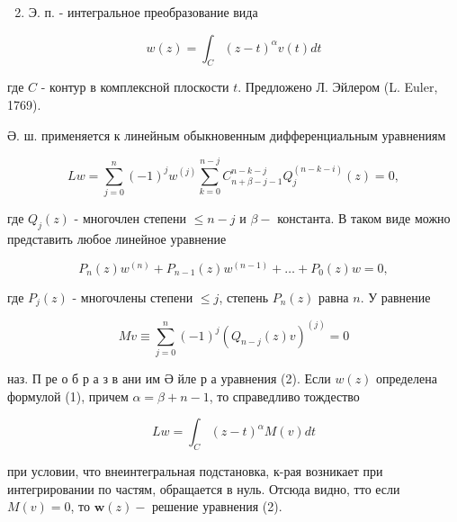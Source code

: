 \documentclass[10pt]{article}
\begin{document}
\begin{enumerate}

  \setcounter{enumi}{1}

  \item Э. п. - интегральное преобразование вида

\end{enumerate}



\[

w(z)=\int_{C}(z-t)^{\alpha} v(t) d t

\]



где $C$ - контур в комплексной плоскости $t$. Предложено Л. Эйлером (L. Euler, 1769).



Ә. ш. применяется к линейным обыкновенным дифференциальным уравнениям



\[

L w=\sum_{j=0}^{n}(-1)^{j} w^{(j)} \sum_{k=0}^{n-j} C_{n+\beta-j-1}^{n-k-j} Q_{j}^{(n-k-i)}(z)=0,

\]



где $Q_{j}(z)$ - многочлен степени $\leqslant n-j$ и $\beta-$ константа. В таком виде можно представить любое линейное уравнение



\[

P_{n}(z) w^{(n)}+P_{n-1}(z) w^{(n-1)}+\ldots+P_{0}(z) w=0,

\]



где $P_{j}(z)$ - многочлены степени $\leqslant j$, степень $P_{n}(z)$ равна $n$. У равнение



\[

M v \equiv \sum_{j=0}^{n}(-1)^{j}\left(Q_{n-j}(z) v\right)^{(j)}=0

\]



наз. П ре о б р а з в ани им Ә йле р а уравнения (2). Если $w(z)$ определена формулой (1), причем $\alpha=\beta+n-1$, то справедливо тождество



\[

L w=\int_{C}(z-t)^{\alpha} M(v) d t

\]



при условии, что внеинтегральная подстановка, к-рая возникает при интегрировании по частям, обращается в нуль. Отсюда видно, тто если $M(v)=0$, то $\boldsymbol{w}(z)-$ решение уравнения (2).
\end{document}
